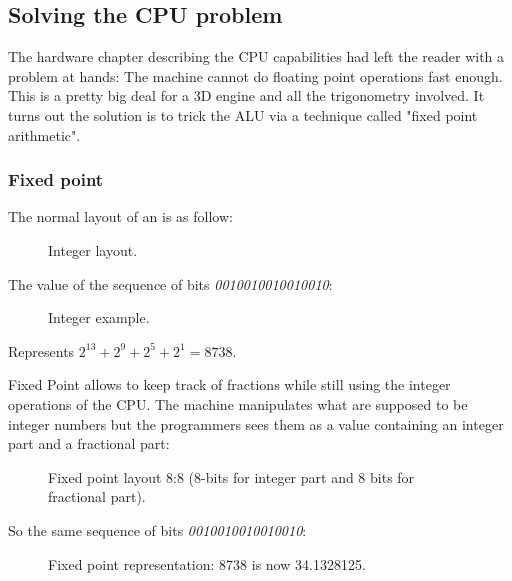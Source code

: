 \subsection{Solving the CPU problem}

The hardware chapter describing the CPU capabilities had left the reader with a problem at hands: The machine cannot do floating point operations fast enough. This is a pretty big deal for a 3D engine and all the trigonometry involved. It turns out the solution is to trick the ALU via a technique called "fixed point arithmetic".







\subsubsection{Fixed point}
The normal layout of an  is as follow:
\begin{figure}[H]
\centering
 
 \caption{Integer layout.} \label{fig:int_layout}
 \end{figure}
The value of the sequence of bits \emph{0010010010010010}:
\begin{figure}[H]
\centering

 \caption{Integer example.} \label{fig:mips}
 \end{figure}

Represents $ 2^{13} + 2^9 + 2^5 + 2^1 =  8738 $.\\
 \par

Fixed Point allows to keep track of fractions while still using the integer operations of the CPU. The machine manipulates what are supposed to be integer numbers but the programmers sees them as a value containing an integer part and a fractional part:\\
\par
\begin{figure}[H]
 \centering
  
 \caption{Fixed point layout 8:8 (8-bits for integer part and 8 bits for fractional part).} \label{fig:mips}
\end{figure}

So the same sequence of bits \emph{0010010010010010}:
\begin{figure}[H]
 \centering
   
  \caption{Fixed point representation: 8738 is now 34.1328125.} \label{fig:mips}
\end{figure} 

